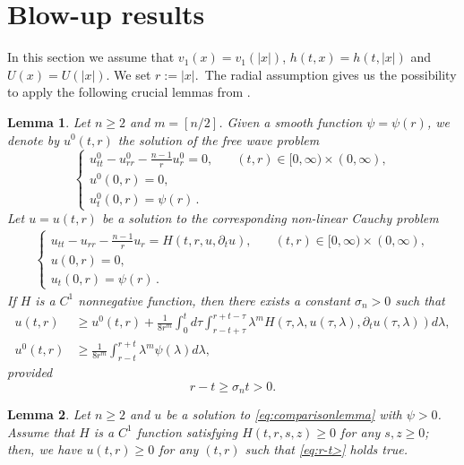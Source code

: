 \documentclass[11pt,reqno]{amsart}
\newtheorem{lemma}{Lemma}
\theoremstyle{definition}
\numberwithin{equation}{section}
\newcommand{\modulo}[1]{{\left|#1\right|}}
\begin{document}
\section{Blow-up results}
\label{sec:blow-up}
In this section we assume that $v_1(x)=v_1(\modulo{x})$, $h(t,x)=h(t,\modulo{x})$ and $U(x)=U(\modulo{x}).$ We set $r:=\modulo{x}.$\  The radial assumption gives us the possibility to apply the following crucial lemmas from \cite{takamura1995}.
\begin{lemma}\label{lemma:Tdeltam}
Let $n\geq 2$ and $m=[n/2]$. Given a smooth function $\psi=\psi(r)$, we 
denote by $u^{0}(t,r)$ the solution of the free wave problem 
\begin{equation}\label{eq:linear_radial}
\begin{cases}
    u^0_{tt}-u^0_{rr}-\frac{n-1}{r}u^0_r=0,  \quad & (t,r)\in [0,\infty)\times (0,\infty),\\
   u^0(0,r)=0, \\ u^0_t(0,r)= \psi(r)\,.
    \end{cases}
\end{equation}
Let $u=u(t,r)$ be a solution to the corresponding non-linear Cauchy problem 
%
\begin{align}\label{eq:comparisonlemma}
\begin{cases}
    u_{tt}-u_{rr}-\frac{n-1}{r}u_r =H(t,r,u,\partial_t u),  \quad & (t,r)\in [0,\infty)\times (0,\infty),\\
    u(0,r)=0, \\  
    u_t(0,r)= \psi(r)\,. 
    \end{cases}
\end{align}
If $H$ is a $C^1$ nonnegative function, then there exists a constant $\sigma_n> 0$ such that 
\begin{align}\label{eq:um}
u(t,r)&\geq  u^0(t,r)+\frac{1}{8r^m}\int_0^t d\tau \int_{r-t+\tau}^{r+t-\tau}\lambda^m H(\tau,\lambda,u(\tau,\lambda), \partial_t u(\tau,\lambda))d \lambda,\\
\label{eq:um0}
u^0(t,r)&\geq \frac{1}{8r^m} \int_{r-t}^{r+t} \lambda^m \psi(\lambda) d\lambda,
\end{align}
provided
\begin{equation}
\label{eq:r-t>}
    r-t\geq \sigma_n t>0.
\end{equation}
\end{lemma}
%
 \begin{lemma}
 \label{lem:comparison}
 Let $n\geq 2$ and $u$ be a solution to \eqref{eq:comparisonlemma}
with $\psi>0$. Assume that $H$ is a $C^1$ function satisfying $H(t,r,s,z)\geq 0$ for any $s,z\geq0$; then, we have $u(t,r)\geq 0$ for any $(t,r)$ such that \eqref{eq:r-t>} holds true.
 \end{lemma}
\end{document}
